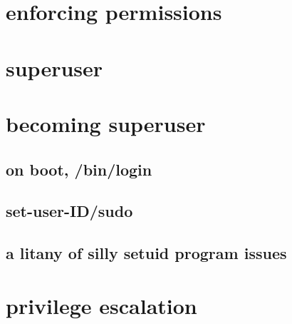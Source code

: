 \section{enforcing permissions}


%

\section{superuser}


\section{becoming superuser}

\subsection{on boot, /bin/login}


\subsection{set-user-ID/sudo}




\subsection{a litany of silly setuid program issues}


\section{privilege escalation}



